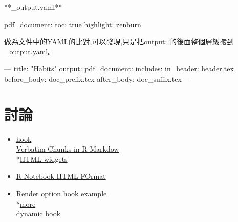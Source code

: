 \documentclass[]{book}
\newenvironment{Shaded}{\begin{snugshade}}{\end{snugshade}}
\newcommand{\StringTok}[1]{\textcolor[rgb]{0.31,0.60,0.02}{#1}}
\newcommand{\OtherTok}[1]{\textcolor[rgb]{0.56,0.35,0.01}{#1}}
\newcommand{\FunctionTok}[1]{\textcolor[rgb]{0.00,0.00,0.00}{#1}}
\newcommand{\AttributeTok}[1]{\textcolor[rgb]{0.77,0.63,0.00}{#1}}
\providecommand{\tightlist}{%
  \setlength{\itemsep}{0pt}\setlength{\parskip}{0pt}}
\theoremstyle{definition}
\theoremstyle{definition}
\theoremstyle{definition}
\theoremstyle{remark}
\begin{document}
**\_output.yaml**

\begin{Shaded}
\begin{Highlighting}[]
\FunctionTok{pdf_document:}
  \FunctionTok{toc:}\AttributeTok{ true}
  \FunctionTok{highlight:}\AttributeTok{ zenburn}
\end{Highlighting}
\end{Shaded}

做為文件中的YAML的比對,可以發現,只是把output:
的後面整個層級搬到\_output.yaml。

\begin{Shaded}
\begin{Highlighting}[]
\OtherTok{---}
\FunctionTok{title:}\AttributeTok{ }\StringTok{"Habits"}
\FunctionTok{output:}
  \FunctionTok{pdf_document:}
    \FunctionTok{includes:}
      \FunctionTok{in_header:}\AttributeTok{ header.tex}
      \FunctionTok{before_body:}\AttributeTok{ doc_prefix.tex}
      \FunctionTok{after_body:}\AttributeTok{ doc_suffix.tex}
\OtherTok{---}
\end{Highlighting}
\end{Shaded}

\section{討論}

\begin{itemize}
\tightlist
\item
  \href{https://github.com/lmmx/devnotes/wiki/Rmarkdown-custom-knit-hook-to-compile-a-multi-part-document}{hook}\\
  \href{https://rmarkdown.rstudio.com/articles_verbatim2.html}{Verbatim
  Chunks in R Markdow}\\
  *\href{https://github.com/rstudio/rmarkdown-book/blob/master/16-widgets.Rmd}{HTML
  widgets}\\
\item
  \href{https://rmarkdown.rstudio.com/r_notebook_format.html}{R Notebook
  HTML FOrmat}\\
\item
  \href{http://brooksandrew.github.io/simpleblog/articles/render-reports-directly-from-R-scripts/}{Render
  option}
  \href{https://selbydavid.com/2017/06/18/rmarkdown-alerts/}{hook
  example}\\
  *\href{https://gist.github.com/yihui/2629886}{more}\\
  \href{https://github.com/yihui/knitr-book}{dynamic book}
\end{itemize}
\end{document}
